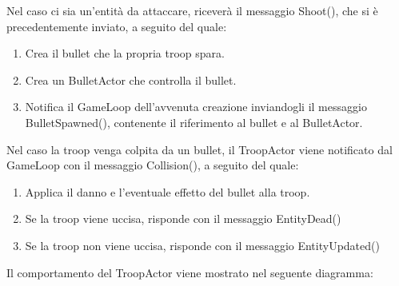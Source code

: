 Nel caso ci sia un'entità da attaccare, riceverà il messaggio Shoot(), che si è precedentemente inviato, a seguito del quale:

\begin{enumerate}
    \item Crea il bullet che la propria troop spara.
    \item Crea un BulletActor che controlla il bullet.
    \item Notifica il GameLoop dell'avvenuta creazione inviandogli il messaggio BulletSpawned(), contenente il riferimento al bullet e al BulletActor.
\end{enumerate}

Nel caso la troop venga colpita da un bullet, il TroopActor viene notificato dal GameLoop con il messaggio Collision(), a seguito del quale:

\begin{enumerate}
    \item Applica il danno e l'eventuale effetto del bullet alla troop.
    \item Se la troop viene uccisa, risponde con il messaggio EntityDead()
    \item Se la troop non viene uccisa, risponde con il messaggio EntityUpdated()
\end{enumerate}

Il comportamento del TroopActor viene mostrato nel seguente diagramma:

